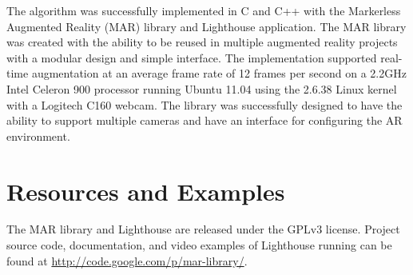\documentclass[oneside,11pt]{Latex/Classes/PhDthesisPSnPDF}
\begin{document}
The algorithm was successfully implemented in C and C++ with the Markerless Augmented Reality (MAR) library and Lighthouse application.  The MAR library was created with the ability to be reused in multiple augmented reality projects with a modular design and simple interface.  The implementation supported real-time augmentation at an average frame rate of 12 frames per second on a 2.2GHz Intel Celeron 900 processor running Ubuntu 11.04 using the 2.6.38 Linux kernel with a Logitech C160 webcam.  The library was successfully designed to have the ability to support multiple cameras and have an interface for configuring the AR environment.


\appendix

\chapter{Resources and Examples}

The MAR library and Lighthouse are released under the GPLv3 license.  Project source code, documentation, and video examples of Lighthouse running can be found at \url{http://code.google.com/p/mar-library/}.

\pagebreak
\begin{footnotesize}

\renewcommand{\bibname}{References}

\end{footnotesize}
\end{document}

